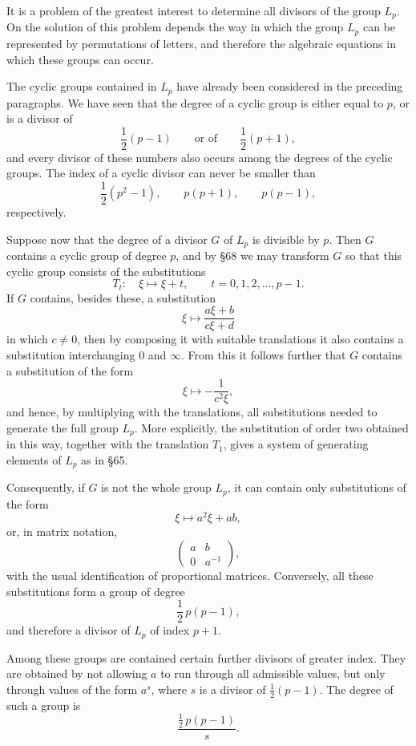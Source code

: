 \documentclass[11pt,a4paper]{book}
\begin{document}
It is a problem of the greatest interest to determine all divisors of the group \(L_p\).  On the solution of this problem depends the way in which the group \(L_p\) can be represented by permutations of letters, and therefore the algebraic equations in which these groups can occur.

The cyclic groups contained in \(L_p\) have already been considered in the preceding paragraphs.  We have seen that the degree of a cyclic group is either equal to \(p\), or is a divisor of
\[
 \frac12(p-1)
 \qquad\text{or of}\qquad
 \frac12(p+1),
\]
and every divisor of these numbers also occurs among the degrees of the cyclic groups.  The index of a cyclic divisor can never be smaller than
\[
 \frac12(p^2-1),\qquad p(p+1),\qquad p(p-1),
\]
respectively.

Suppose now that the degree of a divisor \(G\) of \(L_p\) is divisible by \(p\).  Then \(G\) contains a cyclic group of degree \(p\), and by \S 68 we may transform \(G\) so that this cyclic group consists of the substitutions
\[
 T_t:\quad \xi\longmapsto \xi+t,\qquad t=0,1,2,\ldots,p-1 .
\]
If \(G\) contains, besides these, a substitution
\[
 \xi\longmapsto \frac{a\xi+b}{c\xi+d}
\]
in which \(c\ne0\), then by composing it with suitable translations it also contains a substitution interchanging \(0\) and \(\infty\).  From this it follows further that \(G\) contains a substitution of the form
\[
 \xi\longmapsto -\frac{1}{c^2\xi},
\]
and hence, by multiplying with the translations, all substitutions needed to generate the full group \(L_p\).  More explicitly, the substitution of order two obtained in this way, together with the translation \(T_1\), gives a system of generating elements of \(L_p\) as in \S 65.

Consequently, if \(G\) is not the whole group \(L_p\), it can contain only substitutions of the form
\[
 \xi\longmapsto a^2\xi+ab,
\]
or, in matrix notation,
\[
 \begin{pmatrix} a&b\\0&a^{-1}\end{pmatrix},
\]
with the usual identification of proportional matrices.  Conversely, all these substitutions form a group of degree
\[
 \frac12\,p(p-1),
\]
and therefore a divisor of \(L_p\) of index \(p+1\).

Among these groups are contained certain further divisors of greater index.  They are obtained by not allowing \(a\) to run through all admissible values, but only through values of the form \(a^s\), where \(s\) is a divisor of \(\frac12(p-1)\).  The degree of such a group is
\[
 \frac{\frac12\,p(p-1)}{s}.
\]
\end{document}
